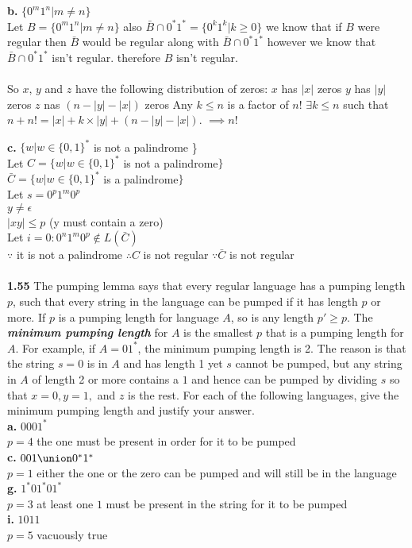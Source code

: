 \documentclass{article}
\begin{document}
{\bf b.} $\{0^{m}1^{n} | m \neq n\}$\\
\subitem Let $B = \{0^m1^n | m \neq n\}$
\subitem also $\bar{B}\cap0^*1^* = \{0^k1^k | k \geq 0\}$
\subitem we know that if $B$ were regular then $\bar{B}$ would be regular along with $\bar{B}\cap0^*1^*$
\subitem however we know that $\bar{B}\cap0^*1^*$ isn't regular.
\subitem therefore $B$ isn't regular.
\\
\\
\subitem So $x$, $y$ and $z$ have the following distribution of zeros:
	\subsubitem $x$ has $|x|$ zeros
	\subsubitem $y$ has $|y|$ zeros
	\subsubitem $z$ nas $(n - |y| - |x|)$ zeros
\subitem Any $k \le n$ is a factor of $n!$
\subitem $\exists k \le n$ such that $n + n! = |x| + k \times |y| + (n - |y| - |x|)$.
\subitem $\implies n! $ 



{\bf c.} $\{w | w \in \{0,1\}^{*} $ is not a palindrome \} \\
\subitem
Let $C = \{w | w \in \{0,1\}^{*} $ is not a palindrome$ \}$\\
$\bar{C} = \{w | w \in \{0,1\}^{*} $ is a palindrome$ \}$\\
Let $s = 0^{p}1^{m}0^{p}$\\
$y \neq \epsilon$\\
$|xy| \leq p$ (y must contain a zero)\\
Let $i = 0 : 0^{n}1^{m}0^{p} \notin L(\bar{C})$\\
$\because$ it is not a palindrome
$\therefore C$ is not regular
$\because \bar{C}$ is not regular\\
\\

{\bf 1.55} The pumping lemma says that every regular language has a pumping length $p$, such that every string in the language can be pumped if it has length $p$ or more. If $p$ is a pumping length for language $A$, so is any length $p' \geq p$. The {\bf {\em minimum pumping length}} for $A$ is the smallest $p$ that is a pumping length for $A$. For example, if $A = 01^{*}$, the minimum pumping length is 2. The reason is that the string $s=0$ is in $A$ and has length 1 yet $s$ cannot be pumped, but any string in $A$ of length 2 or more contains a $1$ and hence can be pumped by dividing $s$ so that $x=0, y = 1,$ and $z$ is the rest. For each of the following languages, give the minimum pumping length and justify your answer.
\\{\bf a.} $0001^{*}$
\\$p=4$ the one must be present in order for it to be pumped
\\{\bf c.} $001 \union 0^{*}1^{*}$
\\$p=1$ either the one or the zero can be pumped and will still be in the language
\\{\bf g.} $1^{*}01^{*}01^{*}$
\\$p=3$ at least one $1$ must be present in the string for it to be pumped
\\{\bf i.} $1011$
\\$p=5$ vacuously true
\end{document}
